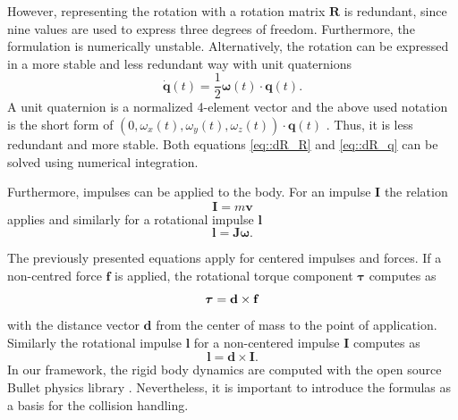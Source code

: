 However, representing the rotation with a rotation matrix $\mathbf R$ is redundant, since nine values are used to express three degrees of freedom. Furthermore, the formulation is numerically unstable. Alternatively, the rotation can be expressed in a more stable and less redundant way with unit quaternions 
\begin{equation}
\label{eq::dR_q}
	\dot{\mathbf{q}}(t)=\frac{1}{2}\boldsymbol\omega(t)\cdot  \mathbf q(t).
\end{equation}
A unit quaternion is a normalized 4-element vector and the above used notation is the short form of $(0,\omega_x(t),\omega_y(t),\omega_z(t))\cdot \mathbf{q}(t)$ \cite{BENDER2007}. 
Thus, it is less redundant and more stable. Both equations \ref{eq::dR_R} and \ref{eq::dR_q} can be solved using numerical integration.

Furthermore, impulses can be applied to the body.
For an impulse $\mathbf I$ the relation
\begin{equation}
\label{eq::impulse}
	\mathbf I=m\mathbf v
\end{equation}
applies and similarly for a rotational impulse $\mathbf l$
\begin{equation}
\mathbf	l=\mathbf J\boldsymbol\omega.
\end{equation}

The previously presented equations apply for centered impulses and forces. If a non-centred force $\mathbf f$ is applied, the rotational torque component $\boldsymbol\tau$ computes as
\begin{equation}
\boldsymbol\tau= \mathbf d\times \mathbf f\\
\end{equation}
with the distance vector $\mathbf d$ from the center of mass to the point of application. Similarly the rotational impulse $\mathbf l$ for a non-centered impulse $\mathbf I$ computes as
\begin{equation}
\mathbf l=\mathbf d\times \mathbf I.
\end{equation}
In our framework, the rigid body dynamics are computed with the open source Bullet physics library \cite{COUMANS2006}. Nevertheless, it is important to introduce the formulas as a basis for the collision handling.


